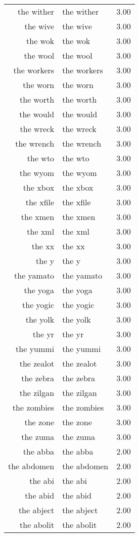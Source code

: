 \begin{table}[ht]
\begin{tabular}{rlr}
  the wither & the wither & 3.00 \\ 
  the wive & the wive & 3.00 \\ 
  the wok & the wok & 3.00 \\ 
  the wool & the wool & 3.00 \\ 
  the workers & the workers & 3.00 \\ 
  the worn & the worn & 3.00 \\ 
  the worth & the worth & 3.00 \\ 
  the would & the would & 3.00 \\ 
  the wreck & the wreck & 3.00 \\ 
  the wrench & the wrench & 3.00 \\ 
  the wto & the wto & 3.00 \\ 
  the wyom & the wyom & 3.00 \\ 
  the xbox & the xbox & 3.00 \\ 
  the xfile & the xfile & 3.00 \\ 
  the xmen & the xmen & 3.00 \\ 
  the xml & the xml & 3.00 \\ 
  the xx & the xx & 3.00 \\ 
  the y & the y & 3.00 \\ 
  the yamato & the yamato & 3.00 \\ 
  the yoga & the yoga & 3.00 \\ 
  the yogic & the yogic & 3.00 \\ 
  the yolk & the yolk & 3.00 \\ 
  the yr & the yr & 3.00 \\ 
  the yummi & the yummi & 3.00 \\ 
  the zealot & the zealot & 3.00 \\ 
  the zebra & the zebra & 3.00 \\ 
  the zilgan & the zilgan & 3.00 \\ 
  the zombies & the zombies & 3.00 \\ 
  the zone & the zone & 3.00 \\ 
  the zuma & the zuma & 3.00 \\ 
  the abba & the abba & 2.00 \\ 
  the abdomen & the abdomen & 2.00 \\ 
  the abi & the abi & 2.00 \\ 
  the abid & the abid & 2.00 \\ 
  the abject & the abject & 2.00 \\ 
  the abolit & the abolit & 2.00 \\ 

\end{tabular}
\end{table}
